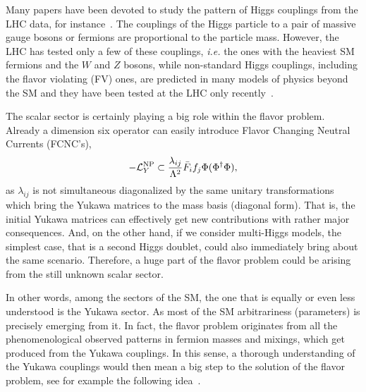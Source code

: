 \documentclass[aps,prd,groupaddress,floatfix,tighten,nofootinbib,showpacs,
amsfonts,superscriptaddress]{revtex4}
\begin{document}
Many papers have been devoted to study the pattern of Higgs couplings from the LHC data, for instance~\cite{Espinosa:2012ir,Giardino:2013bma}. 
The couplings of the Higgs particle to a pair of massive gauge bosons or fermions 
are proportional  to the particle mass.  However,  the LHC has tested only a few of these couplings,
\textit{i.e.} the ones with the heaviest SM fermions and the $W$ and $Z$ bosons, while non-standard Higgs couplings, 
including the flavor violating (FV) ones, are predicted in many models of physics beyond the SM and they  
have been tested  at the LHC only recently~\cite{Branco:2011iw, DiazCruz:2004tr, DiazCruz:2002er}.  


The scalar sector is certainly playing a big role within the flavor problem. 
Already a dimension six operator can easily introduce Flavor Changing Neutral Currents (FCNC's),
%
\begin{eqnarray}
	-{\cal L}_Y^{\text{NP}} \subset \frac{\lambda_{ij}}{\Lambda^2} \bar{F}_i f_j \Phi (\Phi^\dagger \Phi) ,
\end{eqnarray}
%
as $\lambda_{ij}$ is not simultaneous diagonalized by the same unitary transformations which
bring the Yukawa matrices to the mass basis (diagonal form). That is, the initial Yukawa matrices can effectively get new contributions with rather major consequences. And, on the other hand, if we consider multi-Higgs models, the simplest case, that is a second Higgs doublet, could also immediately bring about the same scenario. Therefore, a huge part of the flavor problem could be arising from the still unknown scalar sector.

In other words, among the sectors of the SM, the one that is equally or even less  understood is the Yukawa sector. As most of the SM arbitrariness (parameters) is precisely emerging from it. In fact, the flavor problem originates from all the phenomenological observed patterns in fermion masses and mixings, which get produced from the Yukawa couplings. In this sense, a thorough understanding of the Yukawa couplings would then mean a big step to the solution of the flavor problem, {see for example the following idea~\cite{Saldana-Salazar:2015raa,Saldana-Salazar:2016hxb,DiazCruz:2004ss}}.
\end{document}
